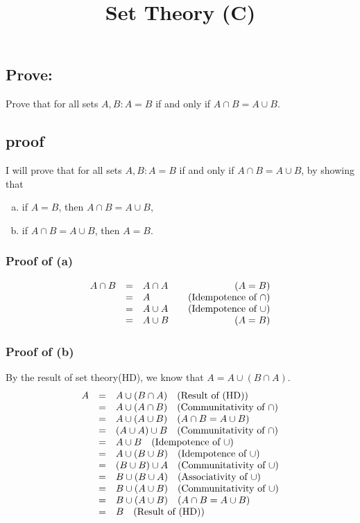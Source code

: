 \documentclass{article}
\title{Set Theory (C)}
\author{}
\date{}
\begin{document}
	\begin{spacing}{1.5}
		\maketitle
		
		\section*{Prove:}
		Prove that for all sets $ A, B: A=B$ if and only if $A \cap B = A \cup B $.
		
		\subsection*{proof}
		I will prove that for all sets $ A, B: A=B$ if and only if $A \cap B = A \cup B $, by showing that 
		\begin{enumerate}[(a)]
			\item if $A=B$, then $ A \cap B = A \cup B $,
			\item if $A \cap B = A \cup B$, then $A=B$.
		\end{enumerate}
		\subsubsection*{Proof of (a)}
		\[\begin{array}{rclr}
			A \cap B &=& A \cap A &\quad\text{($ A=B $)}\\
			&=&  A &\quad\text{(Idempotence of $\cap$)}\\
			&=&  A \cup A &\quad\text{(Idempotence of $\cup$)}\\
			&=&  A \cup B &\quad\text{($ A=B $)}\\
		\end{array}\]
		\subsubsection*{Proof of (b)}
		By the result of set theory(HD), we know that $ A = A \cup (B \cap A) $.
		\[\begin{array}{rclr}
			A &=& A \cup (B \cap A) \quad\text{(Result of (HD))}\\
			&=& A \cup (A \cap B) \quad\text{(Communitativity of $ \cap $)}\\
			&=& A \cup (A \cup B) \quad\text{($ A \cap B = A \cup B $)}\\
			&=& (A \cup A) \cup B \quad\text{(Communitativity of $ \cap $)}\\
			&=& A \cup B \quad\text{(Idempotence of $ \cup $)}\\
			&=& A \cup (B \cup B) \quad\text{(Idempotence of $ \cup $)}\\
			&=& (B \cup B) \cup A \quad\text{(Communitativity of $ \cup $)}\\
			&=& B \cup (B \cup A) \quad\text{(Associativity of $ \cup $)}\\
			&=& B \cup (A \cup B) \quad\text{(Communitativity of $ \cup $)}\\
			&=& B \cup (A \cup B) \quad\text{($ A \cap B = A \cup B $)}\\
			&=& B \quad\text{(Result of (HD))}\\
			

\end{array}\]
\end{spacing}
\end{document}
